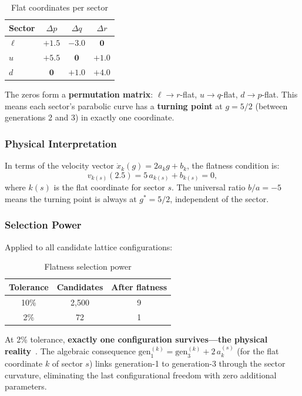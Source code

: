 \begin{table}[h]
\centering
\caption{Flat coordinates per sector}
\begin{tabular}{lccc}
\hline\hline
Sector & $\Delta p$ & $\Delta q$ & $\Delta r$ \\
\hline
$\ell$ & $+1.5$ & $-3.0$ & $\mathbf{0}$ \\
$u$ & $+5.5$ & $\mathbf{0}$ & $+1.0$ \\
$d$ & $\mathbf{0}$ & $+1.0$ & $+4.0$ \\
\hline\hline
\end{tabular}
\end{table}

The zeros form a \textbf{permutation matrix}: $\ell \to r$-flat, $u \to q$-flat, $d \to p$-flat. This means each sector's parabolic curve has a \textbf{turning point} at $g = 5/2$ (between generations 2 and 3) in exactly one coordinate.

\subsubsection{Physical Interpretation}

In terms of the velocity vector $\dot{x}_k(g) = 2a_k g + b_k$, the flatness condition is:
\begin{equation}
v_{k(s)}(2.5) = 5\,a_{k(s)} + b_{k(s)} = 0,
\end{equation}
where $k(s)$ is the flat coordinate for sector $s$. The universal ratio $b/a = -5$ means the turning point is always at $g^* = 5/2$, independent of the sector.

\subsubsection{Selection Power}

Applied to all candidate lattice configurations:

\begin{table}[h]
\centering
\caption{Flatness selection power}
\begin{tabular}{ccc}
\hline\hline
Tolerance & Candidates & After flatness \\
\hline
10\% & 2,500 & 9 \\
2\% & 72 & 1 \\
\hline\hline
\end{tabular}
\end{table}

At 2\% tolerance, \textbf{exactly one configuration survives---the physical reality}~\cite{pdg2024}. The algebraic consequence $\mathrm{gen}_1^{(k)} = \mathrm{gen}_3^{(k)} + 2\,a_k^{(s)}$ (for the flat coordinate $k$ of sector $s$) links generation-1 to generation-3 through the sector curvature, eliminating the last configurational freedom with zero additional parameters.

